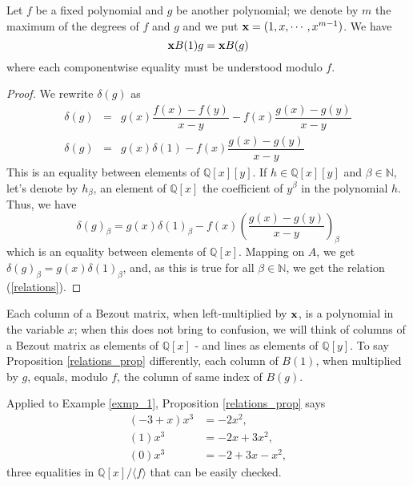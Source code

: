 \documentclass{standalone}
\begin{document}
\begin{prop}
\label{relations_prop}
Let $f$ be a fixed polynomial and $g$ be another polynomial; we denote by $m$ the maximum of the degrees of $f$ and $g$ and we put $\bold{x} = (1, x,\cdots, x^{m-1})$. We have
\begin{equation}
\label{relations}
	\bold{x}B(1)g = \bold{x}B(g)
\end{equation}
where each componentwise equality must be understood modulo $f$.
\end{prop}
\begin{proof}
We rewrite $\delta(g)$ as
\begin{align*} \nonumber
	\delta(g) & = & g(x)\dfrac{f(x)-f(y)}{x-y} - f(x)\dfrac{g(x)-g(y)}{x-y} \\ \nonumber
	\delta(g) & = & g(x)\delta(1) - f(x)\dfrac{g(x)-g(y)}{x-y}
\end{align*}
This is an equality between elements of $\mathbb{Q}[x][y]$. If $h\in \mathbb{Q}[x][y]$ and $\beta\in\mathbb{N}$, let's denote by $h_\beta$, an element of $\mathbb{Q}[x]$ the coefficient of $y^\beta$ in the polynomial $h$. Thus, we have
$$\delta(g)_\beta = g(x)\delta(1)_\beta - f(x)\left(\dfrac{g(x)-g(y)}{x-y}\right)_\beta$$
which is an equality between elements of $\mathbb{Q}[x]$. Mapping on $A$, we get
$\delta(g)_\beta = g(x)\delta(1)_\beta$,
and, as this is true for all $\beta\in\mathbb{N}$, we get the relation (\ref{relations}).
\end{proof}

\begin{rem}

Each column of a Bezout matrix, when left-multiplied by $\bold{x}$, is a polynomial in the variable $x$; when this does not bring to confusion, we will think of columns of a Bezout matrix as elements of $\mathbb{Q}[x]$ - and lines as elements of $\mathbb{Q}[y]$.
To say Proposition \ref{relations_prop} differently, each column of $B(1)$, when multiplied by $g$, equals, modulo $f$, the column of same index of $B(g)$.
\end{rem}

\begin{exmp}
Applied to Example \ref{exmp_1}, Proposition \ref{relations_prop} says
\begin{align*} \nonumber
 (-3 + x)x^3 &= -2x^2, \\
 (1)x^3 &= -2x + 3x^2, \\
 (0)x^3 &= -2 + 3x - x^2,
\end{align*}
three equalities in $\mathbb{Q}[x]/\langle f \rangle$ that can be easily checked.
\end{exmp}
\end{document}
